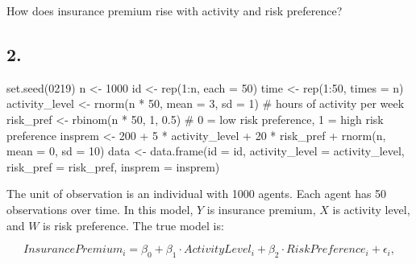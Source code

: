 \documentclass[
  letterpaper,
  DIV=11,
  numbers=noendperiod]{scrartcl}
\newenvironment{Shaded}{\begin{snugshade}}{\end{snugshade}}
\newcommand{\AttributeTok}[1]{\textcolor[rgb]{0.40,0.45,0.13}{#1}}
\newcommand{\CommentTok}[1]{\textcolor[rgb]{0.37,0.37,0.37}{#1}}
\newcommand{\DecValTok}[1]{\textcolor[rgb]{0.68,0.00,0.00}{#1}}
\newcommand{\FloatTok}[1]{\textcolor[rgb]{0.68,0.00,0.00}{#1}}
\newcommand{\FunctionTok}[1]{\textcolor[rgb]{0.28,0.35,0.67}{#1}}
\newcommand{\NormalTok}[1]{\textcolor[rgb]{0.00,0.23,0.31}{#1}}
\newcommand{\OtherTok}[1]{\textcolor[rgb]{0.00,0.23,0.31}{#1}}
\newcommand{\SpecialCharTok}[1]{\textcolor[rgb]{0.37,0.37,0.37}{#1}}
\begin{document}
How does insurance premium rise with activity and risk preference?

\subsection{2.}\label{section}

\begin{Shaded}
\begin{Highlighting}[]
\FunctionTok{set.seed}\NormalTok{(}\DecValTok{0219}\NormalTok{)}
\NormalTok{n }\OtherTok{\textless{}{-}} \DecValTok{1000}
\NormalTok{id }\OtherTok{\textless{}{-}} \FunctionTok{rep}\NormalTok{(}\DecValTok{1}\SpecialCharTok{:}\NormalTok{n, }\AttributeTok{each =} \DecValTok{50}\NormalTok{)}
\NormalTok{time }\OtherTok{\textless{}{-}} \FunctionTok{rep}\NormalTok{(}\DecValTok{1}\SpecialCharTok{:}\DecValTok{50}\NormalTok{, }\AttributeTok{times =}\NormalTok{ n)}
\NormalTok{activity\_level }\OtherTok{\textless{}{-}} \FunctionTok{rnorm}\NormalTok{(n }\SpecialCharTok{*} \DecValTok{50}\NormalTok{, }\AttributeTok{mean =} \DecValTok{3}\NormalTok{, }\AttributeTok{sd =} \DecValTok{1}\NormalTok{) }\CommentTok{\# hours of activity per week}
\NormalTok{risk\_pref }\OtherTok{\textless{}{-}} \FunctionTok{rbinom}\NormalTok{(n }\SpecialCharTok{*} \DecValTok{50}\NormalTok{, }\DecValTok{1}\NormalTok{, }\FloatTok{0.5}\NormalTok{) }\CommentTok{\# 0 = low risk preference, 1 = high risk preference}
\NormalTok{insprem }\OtherTok{\textless{}{-}} \DecValTok{200} \SpecialCharTok{+} \DecValTok{5} \SpecialCharTok{*}\NormalTok{ activity\_level }\SpecialCharTok{+} \DecValTok{20} \SpecialCharTok{*}\NormalTok{ risk\_pref }
\SpecialCharTok{+} \FunctionTok{rnorm}\NormalTok{(n, }\AttributeTok{mean =} \DecValTok{0}\NormalTok{, }\AttributeTok{sd =} \DecValTok{10}\NormalTok{)}
\NormalTok{data }\OtherTok{\textless{}{-}} \FunctionTok{data.frame}\NormalTok{(}\AttributeTok{id =}\NormalTok{ id, }\AttributeTok{activity\_level =}\NormalTok{ activity\_level, }\AttributeTok{risk\_pref =}\NormalTok{ risk\_pref, }\AttributeTok{insprem =}\NormalTok{ insprem)}
\end{Highlighting}
\end{Shaded}

The unit of observation is an individual with 1000 agents. Each agent
has 50 observations over time. In this model, \(Y\) is insurance
premium, \(X\) is activity level, and \(W\) is risk preference. The true
model is:

\[InsurancePremium_i = \beta_0 + \beta_1\cdot ActivityLevel_i + \beta_2\cdot RiskPreference_i + \epsilon_i,\]
\end{document}

